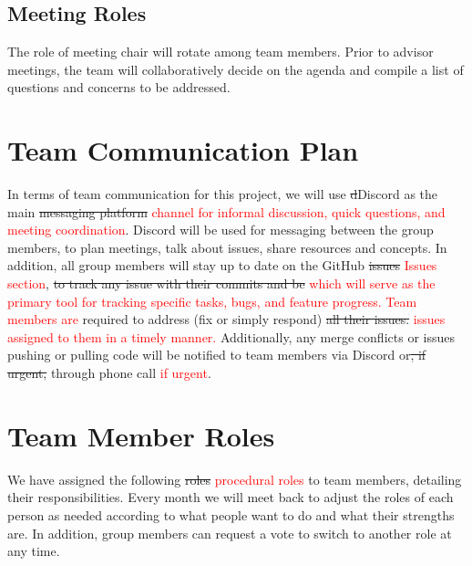 \documentclass{article}
\begin{document}
\subsection{Meeting Roles}
The role of meeting chair will rotate among team members. Prior to advisor meetings, the team will collaboratively decide on the agenda and compile a list of questions and concerns to be addressed.

\section{Team Communication Plan}
In terms of team communication for this project, we will use \sout{d}Discord as the main \sout{messaging platform} \textcolor{red}{channel for informal discussion, quick questions, and meeting coordination}. Discord will be used for messaging between the group members, to plan meetings, talk about issues, share resources and concepts. In addition, all group members will stay up to date on the GitHub \sout{issues} \textcolor{red}{Issues section}, \sout{to track any issue with their commits and be} \textcolor{red}{which will serve as the primary tool for tracking specific tasks, bugs, and feature progress. Team members are} required to address (fix or simply respond) \sout{all their issues.} \textcolor{red}{issues assigned to them in a timely manner.} Additionally, any merge conflicts or issues pushing or pulling code will be notified to team members via Discord or\sout{, if urgent,} through phone call \textcolor{red}{if urgent}.

\section{Team Member Roles}

We have assigned the following \sout{roles} \textcolor{red}{procedural roles} to team members, detailing their responsibilities.
Every month we will meet back to adjust the roles of each person as needed according to what people want to do and what their strengths are. In addition, group members can request a vote to switch to another role at any time.
\end{document}
